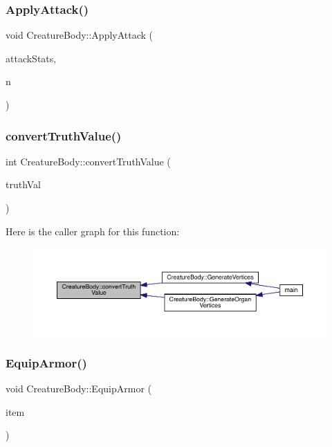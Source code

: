 \subsubsection{\texorpdfstring{Apply\+Attack()}{ApplyAttack()}}
{\footnotesize\ttfamily void Creature\+Body\+::\+Apply\+Attack (\begin{DoxyParamCaption}\item[{\mbox{\hyperlink{struct_attack_stats}{Attack\+Stats}}}]{attack\+Stats,  }\item[{int}]{n }\end{DoxyParamCaption})}

\mbox{\label{class_creature_body_a2e5f101eb4ce889f47810e8e65164d50}} 
\subsubsection{\texorpdfstring{convert\+Truth\+Value()}{convertTruthValue()}}
{\footnotesize\ttfamily int Creature\+Body\+::convert\+Truth\+Value (\begin{DoxyParamCaption}\item[{std\+::string}]{truth\+Val }\end{DoxyParamCaption})}

Here is the caller graph for this function\+:
\nopagebreak
\begin{figure}[H]
\begin{center}
\leavevmode
\includegraphics[width=350pt]{class_creature_body_a2e5f101eb4ce889f47810e8e65164d50_icgraph}
\end{center}
\end{figure}
\mbox{\label{class_creature_body_a5a14d8decef3d1051ac7e9d79a1a4b72}} 
\subsubsection{\texorpdfstring{Equip\+Armor()}{EquipArmor()}}
{\footnotesize\ttfamily void Creature\+Body\+::\+Equip\+Armor (\begin{DoxyParamCaption}\item[{\mbox{\hyperlink{class_item}{Item}} $\ast$}]{item }\end{DoxyParamCaption})}

